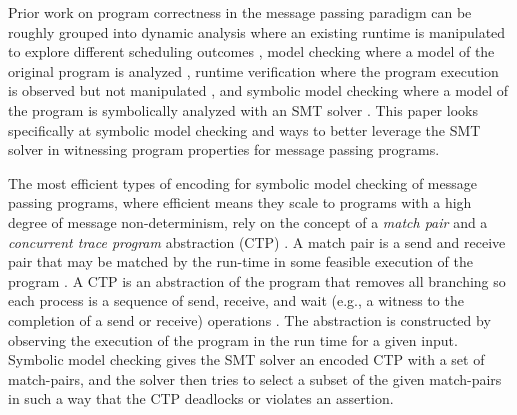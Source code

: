 Prior work on program correctness in the message passing paradigm can be roughly grouped into dynamic analysis where an existing runtime is manipulated to explore different scheduling outcomes \cite{DBLP:conf/ppopp/VakkalankaSGK08,DBLP:conf/sbmf/SharmaGB12}, model checking where a model of the original program is analyzed \cite{DBLP:conf/vmcai/Siegel07,DBLP:conf/pvm/Siegel07}, runtime verification where the program execution is observed but not manipulated \cite{DBLP:conf/sc/VetterS00,DBLP:conf/parco/KrammerBMR03,DBLP:conf/ptw/HilbrichSSM09}, and symbolic model checking where a model of the program is symbolically analyzed with an SMT solver \cite{DBLP:conf/kbse/HuangMM13,HuangNFM15}. This paper looks specifically at symbolic model checking and ways to better leverage the SMT solver in witnessing program properties for message passing programs.

The most efficient types of encoding for symbolic model checking of message passing programs, where efficient means they scale to programs with a high degree of message non-determinism, rely on the concept of a \emph{match pair} and a \emph{concurrent trace program} abstraction (CTP) \cite{DBLP:conf/kbse/HuangMM13,HuangNFM15,DBLP:conf/fm/ForejtKNS14,DBLP:conf/atva/ElwakilYW10,DBLP:conf/issta/ElwakilY10}. 
A match pair is a send and receive pair that may be matched by the run-time in some feasible execution of the program \cite{DBLP:conf/kbse/HuangMM13,HuangNFM15,DBLP:conf/fm/ForejtKNS14,DBLP:conf/atva/ElwakilYW10,DBLP:conf/issta/ElwakilY10}. 
A CTP is an abstraction of the program that removes all branching so each process is a sequence of send, receive, and wait (e.g., a witness to the completion of a send or receive) operations \cite{DBLP:conf/kbse/HuangMM13,HuangNFM15}. 
The abstraction is constructed by observing the execution of the program in the run time for a given input. Symbolic model checking gives the SMT solver an encoded CTP with a set of match-pairs, and the solver then tries to select a subset of the given  match-pairs in such a way that the CTP deadlocks or violates an assertion. 


